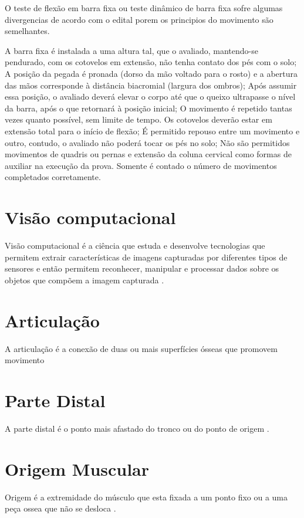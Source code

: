 O teste de flexão em barra fixa ou teste dinâmico de barra fixa sofre algumas divergencias de acordo com o edital porem os principios do movimento são semelhantes.

A barra fixa é instalada a uma altura tal, que o avaliado, mantendo-se pendurado, com os cotovelos em extensão, não tenha contato dos pés com o solo;
A posição da pegada é pronada (dorso da mão voltado para o rosto) e a abertura das mãos corresponde à distância biacromial (largura dos ombros);
Após assumir essa posição, o avaliado deverá elevar o corpo até que o queixo ultrapasse o nível da barra, após o que retornará à posição inicial;
O movimento é repetido tantas vezes quanto possível, sem limite de tempo.
Os cotovelos deverão estar em extensão total para o início de flexão;
É permitido repouso entre um movimento e outro, contudo, o avaliado não poderá tocar os pés no solo;
Não são permitidos movimentos de quadris ou pernas e extensão da coluna cervical como formas de auxiliar na execução da prova.
Somente é contado o número de movimentos completados corretamente.


\section[Visão computacional]{Visão computacional}
Visão computacional é a ciência que estuda e desenvolve tecnologias que permitem extrair características de imagens capturadas por diferentes tipos de sensores e então permitem reconhecer, manipular e processar dados sobre os objetos que compõem a imagem capturada \cite{VisaoComp}.




\cite{visao}






\section[Articulação]{Articulação}
A articulação é a conexão de duas ou mais superfícies ósseas que promovem movimento \cite{articulacao}

\section[Parte Distal]{Parte Distal}
A parte distal é o ponto mais afastado do tronco ou do ponto de origem \cite{distal}.

\section[Origem Muscular]{Origem Muscular}
Origem é a extremidade do músculo que esta fixada a um ponto fixo ou a uma peça ossea que não se desloca \cite{sisMuscular}.

